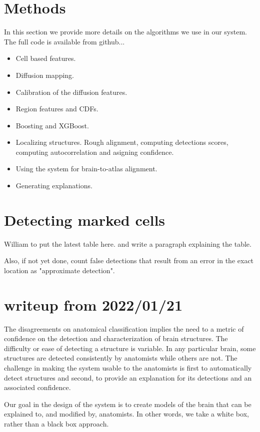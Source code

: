 \documentclass[runningheads]{llncs}
\begin{document}
\section{Methods}
In this section we provide more details on the algorithms we use in
our system. The full code is available from github...

\begin{itemize}
\item Cell based features.
\item Diffusion mapping.
\item Calibration of the diffusion features.
\item Region features and CDFs.
\item Boosting and XGBoost.
\item Localizing structures. Rough alignment, computing detections
  scores, computing autocorrelation and asigning confidence.
\item Using the system for brain-to-atlas alignment.
\item Generating explanations.
\end{itemize}

\section{Detecting marked cells}

William to put the latest table here. and write a paragraph explaining the table.

Also, if not yet done, count false detections that result from an error in the exact location as "approximate detection".

\iffalse
\section{writeup from 2022/01/21}
The disagreements on anatomical classification implies the need to a metric of confidence on the detection and characterization of brain structures.
The difficulty or ease of detecting a structure is variable. 
In any particular brain, some structures are detected consistently by anatomists while others are not.
The challenge in making the system usable to the anatomists is first to automatically detect structures and second, to provide an explanation for its detections and an associated confidence.

Our goal in the design of the system is to create models of the brain
that can be explained to, and modified by, anatomists. In other words,
we take a white box, rather than a black box approach.
\end{document}
